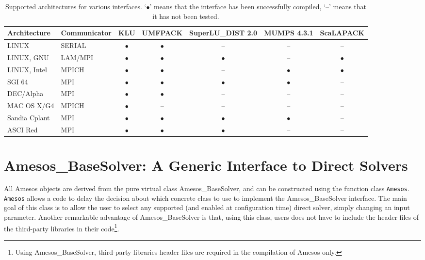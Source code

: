 \documentclass[11pt]{SANDreport}
\begin{document}
\begin{sidewaystable}[tbhp]
  \centering
  \begin{tabular}{| l  l | c | c | c | c | c | }
    \hline
    Architecture & Communicator & KLU & UMFPACK & SuperLU\_DIST 2.0 &
    MUMPS 4.3.1 & ScaLAPACK    \\
    \hline
    LINUX & SERIAL & $\bullet$ & $\bullet$ & -- & -- & -- \\
    LINUX, GNU & LAM/MPI  &$\bullet$  & $\bullet$ & $\bullet$
    & -- & $\bullet$ \\
    LINUX, Intel & MPICH  &$\bullet$  & $\bullet$ & -- 
    & $\bullet$ & $\bullet$ \\
    SGI 64 & MPI & $\bullet$ & $\bullet$ & $\bullet$ & $\bullet$ & -- \\
    DEC/Alpha & MPI & $\bullet$ & $\bullet$ & -- & -- & -- \\
    MAC OS X/G4 & MPICH & $\bullet$ & -- & -- & -- & -- \\
    Sandia Cplant & MPI & $\bullet$ & $\bullet$ & $\bullet$ & $\bullet$ & -- \\
    ASCI Red & MPI & $\bullet$ & $\bullet$ & $\bullet$ & -- & -- \\
    \hline
  \end{tabular}
  \caption{Supported architectures for various interfaces. 
  `$\bullet$' means that the interface has been successfully compiled, 
  `--' means that it has not been tested.}
  \label{tab:arch}
\end{sidewaystable}


\section{Amesos\_BaseSolver: A Generic Interface to Direct Solvers}
\label{sec:amesos_generic}

All Amesos objects are derived from the pure virtual class
Amesos\_BaseSolver, and can be constructed using the function class
\verb!Amesos!.  \verb!Amesos! allows a code to delay the decision about
which concrete class to use to implement the Amesos\_BaseSolver
interface. The main goal of this class is to allow the user to select
any supported (and enabled at configuration time) direct solver, simply
changing an input parameter. Another remarkable advantage of
Amesos\_BaseSolver is that, using this class, users does not have to
include the header files of the third-party libraries in their
code\footnote{Using Amesos\_BaseSolver, third-party libraries header
  files are required in the compilation of Amesos only.}.
\end{document}
